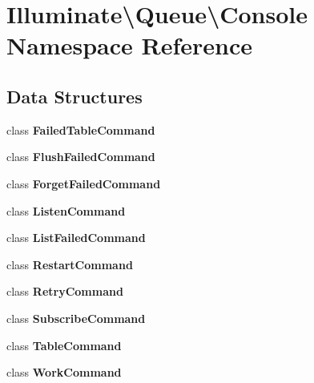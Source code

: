 \section{Illuminate\textbackslash{}Queue\textbackslash{}Console Namespace Reference}
\label{namespace_illuminate_1_1_queue_1_1_console}
\subsection*{Data Structures}
\begin{DoxyCompactItemize}
\item 
class {\bf Failed\+Table\+Command}
\item 
class {\bf Flush\+Failed\+Command}
\item 
class {\bf Forget\+Failed\+Command}
\item 
class {\bf Listen\+Command}
\item 
class {\bf List\+Failed\+Command}
\item 
class {\bf Restart\+Command}
\item 
class {\bf Retry\+Command}
\item 
class {\bf Subscribe\+Command}
\item 
class {\bf Table\+Command}
\item 
class {\bf Work\+Command}
\end{DoxyCompactItemize}
